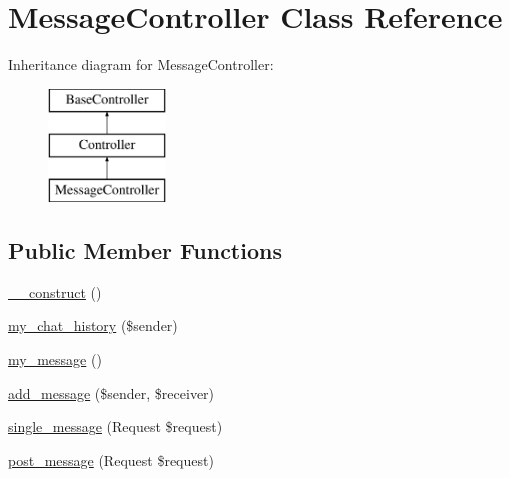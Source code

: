 \hypertarget{class_responsive_1_1_http_1_1_controllers_1_1_message_controller}{}\section{Message\+Controller Class Reference}
\label{class_responsive_1_1_http_1_1_controllers_1_1_message_controller}
Inheritance diagram for Message\+Controller\+:\begin{figure}[H]
\begin{center}
\leavevmode
\includegraphics[height=3.000000cm]{class_responsive_1_1_http_1_1_controllers_1_1_message_controller}
\end{center}
\end{figure}
\subsection*{Public Member Functions}
\begin{DoxyCompactItemize}
\item 
\mbox{\hyperlink{class_responsive_1_1_http_1_1_controllers_1_1_message_controller_a095c5d389db211932136b53f25f39685}{\+\_\+\+\_\+construct}} ()
\item 
\mbox{\hyperlink{class_responsive_1_1_http_1_1_controllers_1_1_message_controller_aa80e8692e0695df05cc641753a22efc1}{my\+\_\+chat\+\_\+history}} (\$sender)
\item 
\mbox{\hyperlink{class_responsive_1_1_http_1_1_controllers_1_1_message_controller_a1ece6e5f0aaed8104e4a2c13c8b64d98}{my\+\_\+message}} ()
\item 
\mbox{\hyperlink{class_responsive_1_1_http_1_1_controllers_1_1_message_controller_a0a82c28e8fefda0e67d25da583ad6525}{add\+\_\+message}} (\$sender, \$receiver)
\item 
\mbox{\hyperlink{class_responsive_1_1_http_1_1_controllers_1_1_message_controller_a0b71550e8a40e4000d861d490ff61fe1}{single\+\_\+message}} (Request \$request)
\item 
\mbox{\hyperlink{class_responsive_1_1_http_1_1_controllers_1_1_message_controller_a8ebe89fe9c868492f4eb8322c789bc64}{post\+\_\+message}} (Request \$request)
\end{DoxyCompactItemize}


